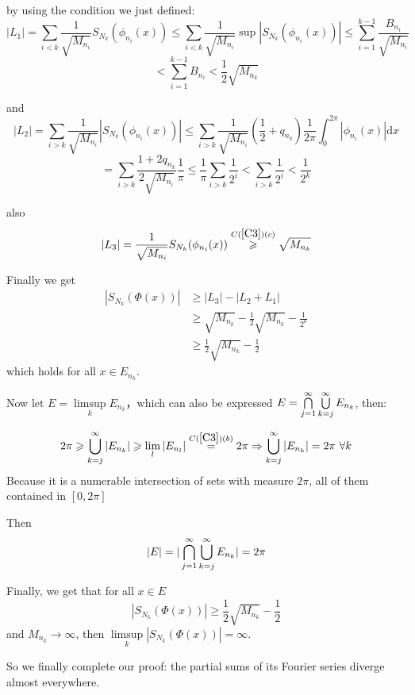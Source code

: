 \documentclass{article}
\begin{document}
by using the condition we just defined:
\[ |L_1|= \sum_{i<k}\frac{1}{\sqrt{M_{n_i}}}S_{N_k}(\phi_{n_i}(x)) \leqslant \sum_{i<k}\frac{1}{\sqrt{M_{n_i}}}\sup|S_{N_k}\left(\phi_{n_i}\left(x\right)\right)| \leqslant \sum_{i=1}^{k-1}\frac{B_{n_i}}{\sqrt{M_{n_i}}}\]
\[ <\sum_{i=1}^{k-1}B_{n_i}<\frac{1}{2}\sqrt{M_{n_k}}\]


and 
\[ |L_2|= \sum_{i>k}\frac{1}{\sqrt{M_{n_i}}}|S_{N_k}(\phi_{n_i}(x))|\leqslant \sum_{i>k}\frac{1}{\sqrt{M_{n_i}}}(\frac{1}{2}+q_{n_k})\frac{1}{2\pi}\int_{0}^{2\pi}|\phi_{n_i}(x)|\mathrm{d}x\]
\[ = \sum_{i>k}\frac{1+2q_{n_k}}{2\sqrt{M_{n_i}}}\frac{1}{\pi}\leqslant \frac{1}{\pi}\sum_{i>k}\frac{1}{2^i}<\sum_{i>k}\frac{1}{2^i}<\frac{1}{2^k}\]
\par
also
\[ |L_3|= \frac{1}{\sqrt{M_{n_i}}}S_{N_k}(\phi_{n_i}(x)) \overset{C(\ref{C3})(c)}{\geqslant } \sqrt{M_{n_k}} \]

Finally we get
\begin{align*}
    |S_{N_k}(\Phi(x))| &\geqslant |L_3| -|L_2+L_1|\\
    &\geqslant \sqrt{M_{n_k}}-\frac{1}{2}\sqrt{M_{n_k}}-\frac{1}{2^k}\\
    &\geqslant \frac{1}{2}\sqrt{M_{n_k}}-\frac{1}{2}
\end{align*}
which holds for all $ x\in E_{n_k} $.\par
Now let $ E= \limsup\limits_k E_{n_k}  $，which can also be expressed $ E=\bigcap\limits_{j=1}^{\infty} \bigcup\limits\limits_{k=j}^{\infty}  E_{n_k} $, then:

\[ 2\pi \geqslant \bigcup\limits\limits_{k=j}^{\infty}  |E_{n_k}|  \geqslant \lim\limits_l|E_{n_l}| \overset{C(\ref{C3})(b)}{=} 2\pi \Rightarrow \bigcup\limits\limits_{k=j}^{\infty} | E_{n_k}|=2\pi \ \forall k\]
Because it is a numerable intersection of sets with measure $ 2\pi $, all of them contained in $ [0,2\pi] $\par
Then 
\[ |E| = |\bigcap\limits_{j=1}^{\infty} \bigcup\limits\limits_{k=j}^{\infty}  E_{n_k}|=2\pi\]


Finally, we get that for all $ x \in E $ 
\[  |S_{N_k}(\Phi(x))| \geqslant\frac{1}{2}\sqrt{M_{n_k}}-\frac{1}{2} \]
and $ M_{n_k} \rightarrow \infty $, then $ \limsup\limits_k |S_{N_k}(\Phi(x))| = \infty$.\par
So we finally complete our proof: the partial sums of its Fourier series diverge almost everywhere.





\end{document}
